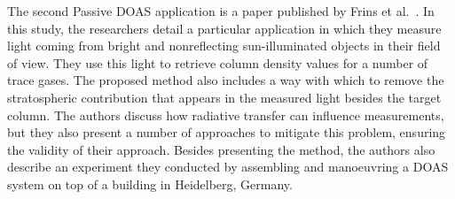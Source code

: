 The second Passive DOAS application is a paper published by Frins et
al.~\cite{Frins2006}. In this study, the researchers detail a particular
application in which they measure light coming from bright and
nonreflecting sun-illuminated objects in their field of view. They use
this light to retrieve column density values for a number of trace
gases. The proposed method also includes a way with which to remove the
stratospheric contribution that appears in the measured light besides
the target column. The authors discuss how radiative transfer can
influence measurements, but they also present a number of approaches to
mitigate this problem, ensuring the validity of their approach.  Besides
presenting the method, the authors also describe an experiment they
conducted by assembling and manoeuvring a DOAS system on top of a
building in Heidelberg, Germany.
 



